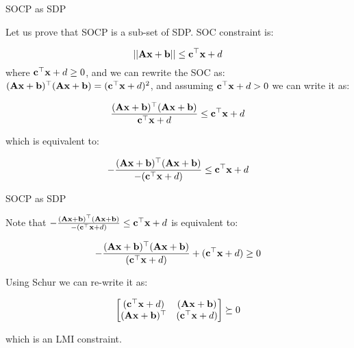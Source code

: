 \documentclass{beamer}
\begin{document}
\begin{frame}{SOCP as SDP}
	\begin{flushleft}
		
		Let us prove that SOCP is a sub-set of SDP. SOC constraint is:
		
		\begin{equation}
			||\mathbf{A}\mathbf{x} + \mathbf{b}|| \leq \mathbf{c}^\top \mathbf{x} + d
		\end{equation}
		where $\mathbf{c}^\top \mathbf{x} + d \geq 0$, and we can rewrite the SOC as: $(\mathbf{A}\mathbf{x} + \mathbf{b})^\top (\mathbf{A}\mathbf{x} + \mathbf{b}) = (\mathbf{c}^\top \mathbf{x} + d)^2$, and assuming $\mathbf{c}^\top \mathbf{x} + d > 0$ we can write it as:
		
		\begin{equation}
			\frac{(\mathbf{A}\mathbf{x} + \mathbf{b})^\top (\mathbf{A}\mathbf{x} + \mathbf{b})}{\mathbf{c}^\top \mathbf{x} + d} \leq \mathbf{c}^\top \mathbf{x} + d
		\end{equation}
		
		which is equivalent to:
		
		\begin{equation}
			-\frac{(\mathbf{A}\mathbf{x} + \mathbf{b})^\top (\mathbf{A}\mathbf{x} + \mathbf{b})}{-(\mathbf{c}^\top \mathbf{x} + d)} \leq \mathbf{c}^\top \mathbf{x} + d
		\end{equation}
		
	\end{flushleft}
\end{frame}





\begin{frame}{SOCP as SDP}
	\begin{flushleft}
		
		Note that $-\frac{(\mathbf{A}\mathbf{x} + \mathbf{b})^\top (\mathbf{A}\mathbf{x} + \mathbf{b})}{-(\mathbf{c}^\top \mathbf{x} + d)} \leq \mathbf{c}^\top \mathbf{x} + d$ is equivalent to:
		
		\begin{equation}
			-\frac{(\mathbf{A}\mathbf{x} + \mathbf{b})^\top (\mathbf{A}\mathbf{x} + \mathbf{b})}{(\mathbf{c}^\top \mathbf{x} + d)} + (\mathbf{c}^\top \mathbf{x} + d) \geq 0
		\end{equation}
		
		Using Schur we can re-write it as:
		
		\begin{equation}
			\begin{bmatrix}
				(\mathbf{c}^\top \mathbf{x} + d) & (\mathbf{A}\mathbf{x} + \mathbf{b}) \\
				(\mathbf{A}\mathbf{x} + \mathbf{b})^\top & (\mathbf{c}^\top \mathbf{x} + d)
			\end{bmatrix} \succeq 0
		\end{equation}
		
		which is an LMI constraint.
		
	\end{flushleft}
\end{frame}
\end{document}
